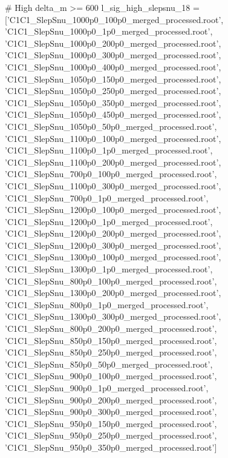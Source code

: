 # High delta_m >= 600
l_sig_high_slepsnu_18 = ['C1C1_SlepSnu_1000p0_100p0_merged_processed.root',
                      'C1C1_SlepSnu_1000p0_1p0_merged_processed.root',
                      'C1C1_SlepSnu_1000p0_200p0_merged_processed.root',
                      'C1C1_SlepSnu_1000p0_300p0_merged_processed.root',
                      'C1C1_SlepSnu_1000p0_400p0_merged_processed.root',
                      'C1C1_SlepSnu_1050p0_150p0_merged_processed.root',
                      'C1C1_SlepSnu_1050p0_250p0_merged_processed.root',
                      'C1C1_SlepSnu_1050p0_350p0_merged_processed.root',
                      'C1C1_SlepSnu_1050p0_450p0_merged_processed.root',
                      'C1C1_SlepSnu_1050p0_50p0_merged_processed.root',
                      'C1C1_SlepSnu_1100p0_100p0_merged_processed.root',
                      'C1C1_SlepSnu_1100p0_1p0_merged_processed.root',
                      'C1C1_SlepSnu_1100p0_200p0_merged_processed.root',
                      'C1C1_SlepSnu_700p0_100p0_merged_processed.root',
                      'C1C1_SlepSnu_1100p0_300p0_merged_processed.root',
                      'C1C1_SlepSnu_700p0_1p0_merged_processed.root',
                      'C1C1_SlepSnu_1200p0_100p0_merged_processed.root',
                      'C1C1_SlepSnu_1200p0_1p0_merged_processed.root',
                      'C1C1_SlepSnu_1200p0_200p0_merged_processed.root',
                      'C1C1_SlepSnu_1200p0_300p0_merged_processed.root',
                      'C1C1_SlepSnu_1300p0_100p0_merged_processed.root',
                      'C1C1_SlepSnu_1300p0_1p0_merged_processed.root',
                      'C1C1_SlepSnu_800p0_100p0_merged_processed.root',
                      'C1C1_SlepSnu_1300p0_200p0_merged_processed.root',
                      'C1C1_SlepSnu_800p0_1p0_merged_processed.root',
                      'C1C1_SlepSnu_1300p0_300p0_merged_processed.root',
                      'C1C1_SlepSnu_800p0_200p0_merged_processed.root',
                      'C1C1_SlepSnu_850p0_150p0_merged_processed.root',
                      'C1C1_SlepSnu_850p0_250p0_merged_processed.root',
                      'C1C1_SlepSnu_850p0_50p0_merged_processed.root',
                      'C1C1_SlepSnu_900p0_100p0_merged_processed.root',
                      'C1C1_SlepSnu_900p0_1p0_merged_processed.root',
                      'C1C1_SlepSnu_900p0_200p0_merged_processed.root',
                      'C1C1_SlepSnu_900p0_300p0_merged_processed.root',
                      'C1C1_SlepSnu_950p0_150p0_merged_processed.root',
                      'C1C1_SlepSnu_950p0_250p0_merged_processed.root',
                      'C1C1_SlepSnu_950p0_350p0_merged_processed.root']






